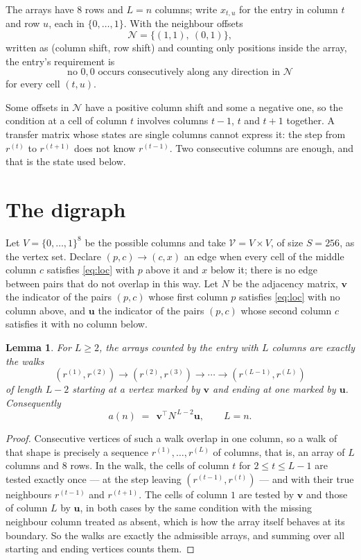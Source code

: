 \documentclass[11pt,a4paper]{article}
\theoremstyle{plain}
\newtheorem{lemma}[theorem]{Lemma}
\theoremstyle{definition}
\begin{document}
The arrays have $8$ rows and $L=n$ columns; write $x_{t,u}$ for the entry in
column $t$ and row $u$, each in $\{0,\dots,1\}$. With the neighbour offsets
\[
\mathcal N=\{(1,1),\ (0,1)\},
\]
written as (column shift, row shift) and counting only positions inside the array, the
entry's requirement is
\begin{equation}\label{eq:loc}
\text{no }0,0\text{ occurs consecutively along any direction in }\mathcal N
\end{equation}
for every cell $(t,u)$.

Some offsets in $\mathcal N$ have a positive column shift and some a negative one, so the
condition at a cell of column $t$ involves columns $t-1$, $t$ and $t+1$ together. A transfer
matrix whose states are single columns cannot express it: the step from $r^{(t)}$ to
$r^{(t+1)}$ does not know $r^{(t-1)}$. Two consecutive columns are enough, and that is
the state used below.

\section{The digraph}

Let $V=\{0,\dots,1\}^{8}$ be the possible columns and take
$\mathcal V=V\times V$, of size $S=256$, as the vertex set. Declare $(p,c)\to(c,x)$ an edge
when every cell of the middle column $c$ satisfies \eqref{eq:loc} with $p$ above it and $x$
below it; there is no edge between pairs that do not overlap in this way. Let $N$ be the
adjacency matrix, $\mathbf{v}$ the indicator of the pairs $(p,c)$ whose first column $p$
satisfies \eqref{eq:loc} with no column above, and $\mathbf{u}$ the indicator of
the pairs $(p,c)$ whose second column $c$ satisfies it with no column below.

\begin{lemma}\label{lem:walk}
For $L\ge2$, the arrays counted by the entry with $L$ columns are exactly the walks
\[
(r^{(1)},r^{(2)})\to(r^{(2)},r^{(3)})\to\cdots\to(r^{(L-1)},r^{(L)})
\]
of length $L-2$ starting at a vertex marked by $\mathbf{v}$ and ending at one marked by
$\mathbf{u}$. Consequently
\[
a(n)\;=\;\,\mathbf{v}^{\!\top}N^{\,L-2}\mathbf{u},\qquad L=n .
\]
\end{lemma}

\begin{proof}
Consecutive vertices of such a walk overlap in one column, so a walk of that shape is
precisely a sequence $r^{(1)},\dots,r^{(L)}$ of columns, that is, an array of $L$ columns
and $8$ rows. In the walk, the cells of column $t$ for $2\le t\le L-1$ are tested
exactly once --- at the step leaving $(r^{(t-1)},r^{(t)})$ --- and with their true
neighbours $r^{(t-1)}$ and $r^{(t+1)}$. The cells of column $1$ are tested by
$\mathbf{v}$ and those of column $L$ by $\mathbf{u}$, in both cases by the same condition
with the missing neighbour column treated as absent, which is how the array itself behaves at
its boundary. So the walks are exactly the admissible arrays, and summing over all starting
and ending vertices counts them.
\end{proof}
\end{document}
